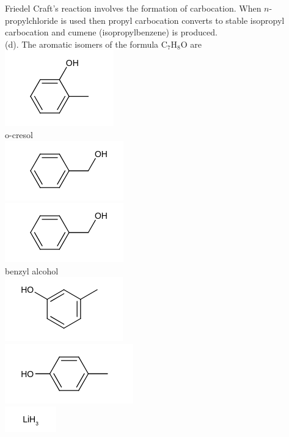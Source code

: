 \documentclass[10pt]{article}
\begin{document}
Friedel Craft's reaction involves the formation of carbocation. When $n$-propylchloride is used then propyl carbocation converts to stable isopropyl carbocation and cumene (isopropylbenzene) is produced.\\
(d). The aromatic isomers of the formula $\mathrm{C}_{7} \mathrm{H}_{8} \mathrm{O}$ are\\
\includegraphics{smile-57a417e596d8db98a6c3ba6d9bf6882c954147fc}\\
o-cresol\\
\includegraphics{smile-0051d497edf6e36b96bcfdbc27eae7789bad1859}\\
\includegraphics{smile-d090f9bd9d77d438c205d7fa2fb9cfdb113566d9}\\
benzyl alcohol\\
\includegraphics{smile-eac903849e2938672679ca55fbbecdf8c84d9b0d}\\
\includegraphics{smile-f8c75d446308016e4708a59bafa509232a8cd454}\\
\includegraphics{smile-a20151f1aa00b783e98319d34975908dff36a23d}\\
\end{document}
